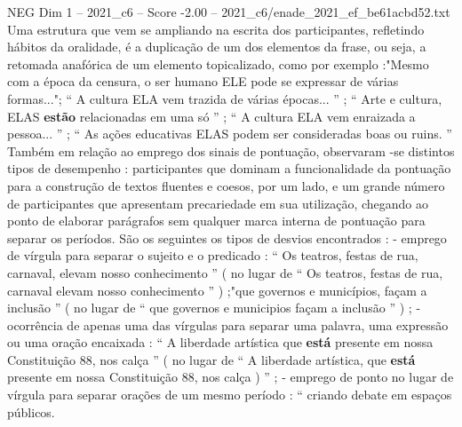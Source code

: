 \begin{textsample}{NEG Dim 1 – 2021\_c6 – Score -2.00 – 2021\_c6/enade\_2021\_ef\_be61acbd52.txt}
Uma estrutura que vem se ampliando na escrita dos participantes, refletindo hábitos da oralidade, é a duplicação de um dos elementos da frase, ou seja, a retomada anafórica de um elemento topicalizado, como por exemplo :"Mesmo com a época da censura, o ser humano ELE pode se expressar de várias formas..."; “ A cultura ELA vem trazida de várias épocas... ” ; “ Arte e cultura, ELAS \textbf{estão} relacionadas em uma só ” ; “ A cultura ELA vem enraizada a pessoa... ” ; “ As ações educativas ELAS podem ser consideradas boas ou ruins. ” Também em relação ao emprego dos sinais de pontuação, observaram -se distintos tipos de desempenho : participantes que dominam a funcionalidade da pontuação para a construção de textos fluentes e coesos, por um lado, e um grande número de participantes que apresentam precariedade em sua utilização, chegando ao ponto de elaborar parágrafos sem qualquer marca interna de pontuação para separar os períodos.
São os seguintes os tipos de desvios encontrados : - emprego de vírgula para separar o sujeito e o predicado : “ Os teatros, festas de rua, carnaval, elevam nosso conhecimento ” ( no lugar de “ Os teatros, festas de rua, carnaval elevam nosso conhecimento ” ) ;"que governos e municípios, façam a inclusão ” ( no lugar de “ que governos e municipios façam a inclusão ” ) ; - ocorrência de apenas uma das vírgulas para separar uma palavra, uma expressão ou uma oração encaixada : “ A liberdade artística que \textbf{está} presente em nossa Constituição 88, nos calça ” ( no lugar de “ A liberdade artística, que \textbf{está} presente em nossa Constituição 88, nos calça ) ” ; - emprego de ponto no lugar de vírgula para separar orações de um mesmo período : “ criando debate em espaços públicos.

\end{textsample}
